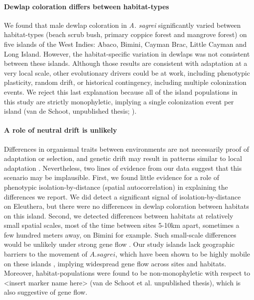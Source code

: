 

\paragraph{Dewlap coloration differs between habitat-types} We found that male dewlap coloration in \textit{A. sagrei} significantly varied between habitat-types (beach scrub bush, primary coppice forest and mangrove forest) on five islands of the West Indies: Abaco, Bimini, Cayman Brac, Little Cayman and Long Island. However, the habitat-specific variation in dewlaps was not consistent between these islands. Although those results are consistent with adaptation at a very local scale, other evolutionary drivers could be at work, including phenotypic plasticity, random drift, or historical contingency, including multiple colonization events. We reject this last explanation because all of the island populations in this study are strictly monophyletic, implying a single colonization event per island (van de Schoot, unpublished thesis; \citealt{Driessens2017, Reynolds2020}).

\paragraph{A role of neutral drift is unlikely} Differences in organismal traits between environments are not necessarily proof of adaptation or selection, and genetic drift may result in patterns similar to local adaptation \citep{Miles2019}. Nevertheless, two lines of evidence from our data suggest that this scenario may be implausible. First, we found little evidence for a role of phenotypic isolation-by-distance (spatial autocorrelation) in explaining the differences we report. We did detect a significant signal of isolation-by-distance on Eleuthera, but there were no differences in dewlap coloration between habitats on this island. Second, we detected differences between habitats at relatively small spatial scales, most of the time between sites 5-10km apart, sometimes a few hundred meters away, on Bimini for example. Such small-scale differences would be unlikely under strong gene flow \citep{Richardson2014}. Our study islands lack geographic barriers to the movement of $A. sagrei$, which have been shown to be highly mobile on these islands \citep{Kamath2018}, implying widespread gene flow across sites and habitats. Moreover, habitat-populations were found to be non-monophyletic with respect to <insert marker name here> (van de Schoot et al. unpublished thesis), which is also suggestive of gene flow.\\

